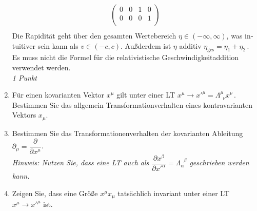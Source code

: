 \documentclass{exercise}
\begin{document}
\begin{enumerate}
{\begin{align*}
\begin{pmatrix}
                0 & 0 & 1 & 0 \\
                0 & 0 & 0 & 1 \\
            \end{pmatrix} \\
        \end{align*}
        Die Rapidität geht über den gesamten Wertebereich $\eta \in \left(-\infty, \infty\right)$, was in­tu­i­tiver sein kann als $v \in \left(-c, c\right)$.
        Außderdem ist $\eta$ additiv $\eta_\text{ges} = \eta_1 + \eta_2$\,.
        Es muss nicht die Formel für die relativistische Geschwindigkeitaddition verwendet werden.\\
        \textit{1 Punkt}
        }
        \item Für einen kovarianten Vektor $x^{\mu}$ gilt unter einer LT $x^{\mu} \rightarrow x'^{\mu} = \Lambda_{\phantom{\nu} \nu}^\mu x^{\nu}\,.$
        Bestimmen Sie das allgemein Transformationverhalten eines kontravarianten Vektors $x_{\mu}$.
        \item Bestimmen Sie das Transformationenverhalten der kovarianten Ableitung $\partial_\mu = \dfrac{\partial}{\partial x^\mu}$.\\
        \textit{Hinweis: Nutzen Sie, dass eine LT auch als $\dfrac{\partial x^\beta}{\partial x'^\alpha} = \Lambda^{\phantom{\beta} \beta}_\alpha$ geschrieben werden kann.}
        \item Zeigen Sie, dass eine Größe $x^\mu x_\mu$ tatsächlich invariant unter einer LT $x^\mu \rightarrow x'^\mu$ ist.
\end{enumerate}
\end{document}
